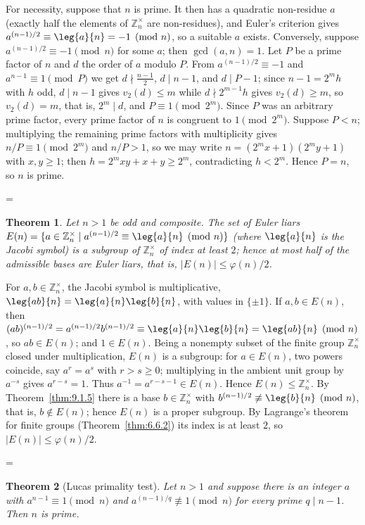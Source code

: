 \documentclass[11pt]{article}
\makeatletter
\theoremstyle{ntstyle}
\newtheorem{theorem}{Theorem}[subsection]
\let\nt@closedisplay\]
\def\nt@guardedclose{\@ifnextchar\par{\nt@closeafterpar}{\@ifnextchar\end{\postdisplaypenalty\@M\nt@closedisplay}{\nt@closedisplay}}}
\def\nt@closeafterpar\par{\@ifnextchar\par{\nt@closeafterpar}{\@ifnextchar\end{\postdisplaypenalty\@M\nt@closedisplay\par}{\nt@closedisplay\par}}}
\renewenvironment{proof}[1][\proofname]{\par
  \pushQED{\qed}\normalfont\topsep\medskipamount\edef\nt@afterproof{\@endparpenalty=\the\@endparpenalty\relax}\@beginparpenalty\@M\@endparpenalty\@M\let\]\nt@guardedclose\trivlist\item[]\textit{#1\@addpunct{.}} \ignorespaces}{\ifvmode\addpenalty\@M\fi\popQED\nt@afterproof\endtrivlist\@endpefalse}
\newcommand{\ZmodUnits}[1]{\mathbb{Z}_{#1}^{\times}}
\makeatother
\begin{document}
\begin{proof} For necessity, suppose that $n$ is prime. It then has
	a quadratic non-residue $a$ (exactly half the elements of $\ZmodUnits{n}$ are non-residues),
	and Euler's criterion gives $a^{(n-1)/2}\equiv\leg{a}{n}=-1\pmod{n}$,
	so a suitable $a$ exists. Conversely, suppose
	$a^{(n-1)/2}\equiv-1\pmod{n}$ for some $a$; then
	$\gcd(a, n)=1$. Let $P$ be a prime factor of $n$ and $d$ the order of
	$a$ modulo $P$. From $a^{(n-1)/2}\equiv-1$ and $a^{n-1}\equiv1\pmod{P}$ we get $d\nmid\tfrac{n-1}{2}$, $d\mid n-1$, and $d\mid P-1$; since
	$n-1=2^{m}h$ with $h$ odd, $d\mid n-1$ gives $v_2(d)\le m$ while
	$d\nmid 2^{m-1}h$ gives $v_2(d)\ge m$, so $v_2(d)=m$, that is, $2^{m}\mid d$, and $P\equiv1\pmod{2^{m}}$.
	Since $P$ was an arbitrary prime factor, every prime factor of $n$ is
	congruent to $1\pmod{2^m}$. Suppose $P<n$; multiplying the remaining prime factors
	with multiplicity gives $n/P\equiv1\pmod{2^m}$ and $n/P>1$, so we may write
	$n=(2^{m}x+1)(2^{m}y+1)$ with $x,y\ge1$; then
	$h=2^{m}xy+x+y\ge2^{m}$, contradicting $h<2^{m}$. Hence $P=n$, so $n$
	is prime.

\end{proof}
\begin{theorem}\label{thm:9.1.7} Let
	$n>1$ be odd and composite. The set of Euler liars
	$E(n)=\{a\in\ZmodUnits{n} \mid a^{(n-1)/2}\equiv\leg{a}{n}\pmod{n}\}$ (where $\leg{a}{n}$ is the Jacobi
	symbol) is a subgroup of $\ZmodUnits{n}$ of index at least
	$2$; hence at most half of the admissible bases are Euler liars, that is, $|E(n)|\le\varphi(n)/2$.

\end{theorem}

\begin{proof} For $a,b\in\ZmodUnits{n}$, the
	Jacobi symbol is multiplicative,
	$\leg{ab}{n}=\leg{a}{n}\leg{b}{n}$, with values in $\{\pm1\}$. If $a,b\in E(n)$, then
	$(ab)^{(n-1)/2}=a^{(n-1)/2}b^{(n-1)/2}\equiv\leg{a}{n}\leg{b}{n}=\leg{ab}{n}\pmod{n}$, so
	$ab\in E(n)$; and $1\in E(n)$. Being a nonempty subset of the finite group $\ZmodUnits{n}$ closed under multiplication, $E(n)$ is a subgroup: for $a\in E(n)$, two powers coincide, say $a^r=a^s$ with $r>s\ge0$; multiplying in the ambient unit group by $a^{-s}$ gives $a^{r-s}=1$. Thus $a^{-1}=a^{r-s-1}\in E(n)$. Hence $E(n)\le\ZmodUnits{n}$. By Theorem~\ref{thm:9.1.5} there is a base
	$b\in\ZmodUnits{n}$ with $b^{(n-1)/2}\not\equiv\leg{b}{n}\pmod{n}$, that is, $b\notin E(n)$; hence $E(n)$ is a proper
	subgroup. By Lagrange's theorem for finite groups (Theorem~\ref{thm:6.6.2}) its index is at least $2$, so
	$|E(n)|\le\varphi(n)/2$.

\end{proof}
\begin{theorem}[Lucas primality test]\label{thm:9.1.8} Let $n>1$
	and suppose there is an integer $a$ with $a^{n-1}\equiv1\pmod{n}$ and
	$a^{(n-1)/q}\not\equiv1\pmod{n}$ for every prime $q\mid n-1$. Then $n$ is prime.

\end{theorem}
\end{document}
